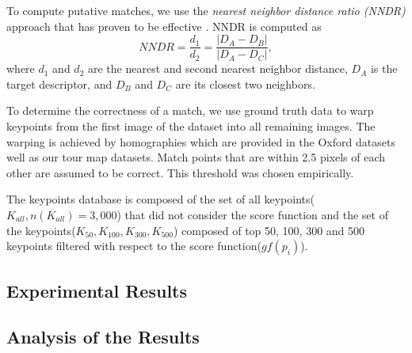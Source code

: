 To compute putative matches, we use the \textit{nearest neighbor distance ratio (NNDR)} approach\cite{szeliski_computer_????} that has proven to be effective \cite{moreels_evaluation_2007,lowe_distinctive_2004}. NNDR is computed as
\begin{equation}
NNDR = \frac{d_1}{d_2} = \frac{|D_A - D_B|}{|D_A - D_C|},
\end{equation}
where $d_1$ and $d_2$ are the nearest and second nearest neighbor distance, $D_A$ is the target descriptor, and $D_B$ and $D_C$ are its closest two neighbors. 

To determine the correctness of a match, we use ground truth data to warp keypoints from the first image of the dataset into all remaining images. The warping is achieved by homographies which are provided in the Oxford datasets well as our tour map datasets. Match points that are within 2.5 pixels of each other are assumed to be correct. This threshold was chosen empirically.

The keypoints database is composed of the set of all keypoints($K_{all}, n(K_{all}) = 3,000$) that did not consider the score function and the set of the keypoints($K_{50}, K_{100}, K_{300}, K_{500}$) composed of top 50, 100, 300 and 500 keypoints filtered with respect to the score function($gf(p_i)$). 

\subsection{Experimental Results}

\subsection{Analysis of the Results}